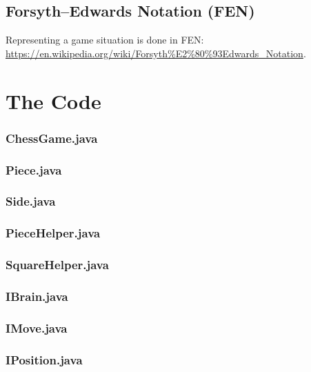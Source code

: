 \documentclass [12pt ,a4paper, english]{scrartcl}
\theoremstyle{plain}
\theoremstyle{definition}
\theoremstyle{remark}
\begin{document}
\subsection{Forsyth–Edwards Notation (FEN)}
Representing a game situation is done in FEN: \url{https://en.wikipedia.org/wiki/Forsyth%E2%80%93Edwards_Notation}.


\section{The Code}

\subsubsection{ChessGame.java}
\label{sec:chessgame}


\subsubsection{Piece.java}


\subsubsection{Side.java}


\subsubsection{PieceHelper.java}


\subsubsection{SquareHelper.java}


\subsubsection{IBrain.java}
\label{sec:ibrain}


\subsubsection{IMove.java}


\subsubsection{IPosition.java}

\end{document}
